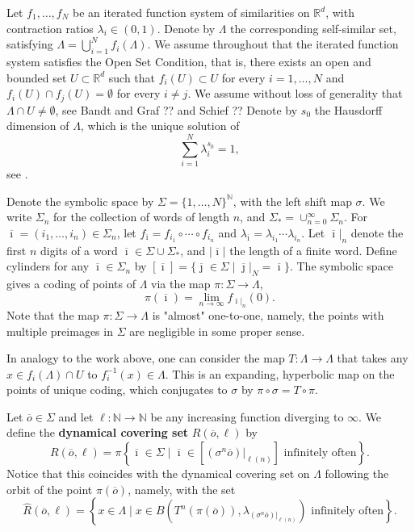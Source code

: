 \documentclass[12pt,]{article}
\theoremstyle{definition}
\theoremstyle{remark}
\renewcommand{\Bbb}[1]{\mathbb{#1}}
\newcommand{\bbN}{{\Bbb N}}         %
\newcommand{\bbR}{{\Bbb R}}        %
\newcommand{\0}{\mathbf{0}}
\newcommand{\bi}{{\overline {\imath}}}
\newcommand{\bj}{{\overline  {\jmath}}}
\newcommand{\bo}{{\overline o}}
\begin{document}
Let $f_1, \dots, f_N$ be an iterated function system of similarities on $\bbR^d$, with contraction
ratios $\lambda_i\in(0,1)$. Denote by $\Lambda$ the corresponding self-similar set, satisfying
\(\Lambda=\bigcup_{i=1}^N f_i(\Lambda).\) We assume throughout that the iterated function system
satisfies the Open Set Condition, that is, there exists an open and bounded set $U\subset\bbR^d$
such that $f_i(U)\subset U$ for every $i=1,\ldots,N$ and $f_i(U)\cap f_j(U)=\emptyset$ for every
$i\neq j$. We assume without loss of generality that $\Lambda\cap U\neq\emptyset$, see Bandt and
Graf ?? and Schief ?? Denote by $s_0$ the Hausdorff dimension of $\Lambda$, which is the unique
solution of
\begin{equation}\label{eq:s0}
  \sum_{i=1}^N\lambda_i^{s_0}=1,
\end{equation}
see \cite{Hutchinson}.

Denote the symbolic space by $\Sigma=\{1, \dots, N\}^\bbN$, with the left shift map $\sigma$. We
write $\Sigma_n$ for the collection of words of length $n$, and $\Sigma_*=\cup_{n=0}^\infty
\Sigma_n$. For $\bi=(i_1, \dots, i_n)\in \Sigma_n$, let $f_{\bi}=f_{i_1}\circ\cdots\circ f_{i_n}$
and $\lambda_\bi=\lambda_{i_1}\cdots \lambda_{i_n}$. Let $\bi|_n$ denote the first $n$ digits of a
word $\bi\in\Sigma\cup\Sigma_*$, and $|\bi|$ the length of a finite word. Define cylinders for any
$\bi\in \Sigma_n$ by \([\bi]=\{\bj\in \Sigma\mid \bj|_N=\bi\}.\)
The symbolic space gives a coding of points of $\Lambda$ via the map $\pi: \Sigma\to \Lambda$,
\[
  \pi(\bi)=\lim_{n\to \infty} f_{\bi|_n}(0).
\]
Note that the map $\pi\colon\Sigma\to\Lambda$ is "almost" one-to-one, namely, the points with
multiple preimages in $\Sigma$ are negligible in some proper sense.

In analogy to the work above, one can consider the map $T\colon\Lambda\to\Lambda$ that takes any
$x\in f_i(\Lambda)\cap U$ to $f_i^{-1}(x)\in \Lambda$. This is an expanding, hyperbolic map on the
points of unique coding, which conjugates to $\sigma$ by $\pi\circ \sigma=T\circ \pi$.

Let $\bo\in \Sigma$ and let $\ell\colon\bbN\to \bbN$ be any increasing function diverging to
$\infty$. We define the {\bf dynamical covering set} $R(\bo, \ell)$ by
\[
  R(\bo, \ell)=\pi\left\{\bi\in \Sigma\mid \bi\in\left[(\sigma^n\bo)|_{\ell(n)}\right]\text{ infinitely often}\right\}.
\]
Notice that this coincides with the dynamical covering set on $\Lambda$ following the orbit of the
point $\pi(\bo)$, namely, with the set
\[
  \widehat R(\bo, \ell)=\left\{x\in \Lambda\mid x\in B\left(T^n(\pi(\bo)), \lambda_{(\sigma^n\bo)|_{\ell(n)}}\right)\text{ infinitely often}\right\}.
\]
\end{document}
